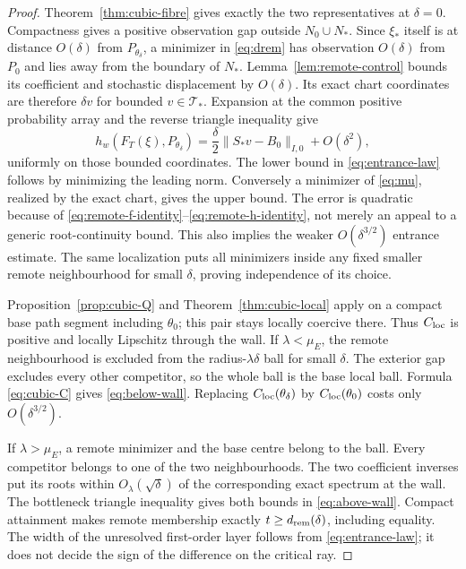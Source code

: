 \begin{proof}
Theorem~\ref{thm:cubic-fibre} gives exactly the two representatives at
$\delta=0$. Compactness gives a positive observation gap outside
$N_0\cup N_*$. Since $\xi_*$ itself is at distance $O(\delta)$ from
$P_{\theta_\delta}$, a minimizer in \eqref{eq:drem} has observation
$O(\delta)$ from $P_0$ and lies away from the boundary of $N_*$.
Lemma~\ref{lem:remote-control} bounds its coefficient and stochastic
displacement by $O(\delta)$. Its exact chart coordinates are therefore
$\delta v$ for bounded $v\in\mathcal T_*$. Expansion at the common
positive probability array and the reverse triangle inequality give
\begin{equation}\label{eq:entrance-expansion}
 h_w(F_T(\xi),P_{\theta_\delta})
       =\frac\delta2\|S_*v-B_0\|_{I,0}+O(\delta^2),
\end{equation}
uniformly on those bounded coordinates. The lower bound in
\eqref{eq:entrance-law} follows by minimizing the leading norm.
Conversely a minimizer of \eqref{eq:mu}, realized by the exact chart,
gives the upper bound. The error is quadratic because of
\eqref{eq:remote-f-identity}--\eqref{eq:remote-h-identity}, not merely
an appeal to a generic root-continuity bound. This also implies the
weaker $O(\delta^{3/2})$ entrance estimate. The same localization puts
all minimizers inside any fixed smaller remote neighbourhood for small
$\delta$, proving independence of its choice.

Proposition~\ref{prop:cubic-Q} and Theorem~\ref{thm:cubic-local} apply
on a compact base path segment including $\theta_0$; this pair stays
locally coercive there. Thus $C_{\mathrm{loc}}$ is positive and locally Lipschitz
through the wall. If $\lambda<\mu_E$, the remote neighbourhood is
excluded from the radius-$\lambda\delta$ ball for small $\delta$.
The exterior gap excludes every other competitor, so the whole ball
is the base local ball. Formula \eqref{eq:cubic-C} gives
\eqref{eq:below-wall}. Replacing $C_{\mathrm{loc}}(\theta_\delta)$ by
$C_{\mathrm{loc}}(\theta_0)$ costs only $O(\delta^{3/2})$.

If $\lambda>\mu_E$, a remote minimizer and the base centre belong to
the ball. Every competitor belongs to one of the two neighbourhoods.
The two coefficient inverses put its roots within
$O_\lambda(\sqrt\delta)$ of the corresponding exact spectrum at the
wall. The bottleneck triangle inequality gives both bounds in
\eqref{eq:above-wall}. Compact attainment makes remote membership
exactly $t\ge d_{\rm rem}(\delta)$, including equality. The width of
the unresolved first-order layer follows from \eqref{eq:entrance-law};
it does not decide the sign of the difference on the critical ray.


\end{proof}
